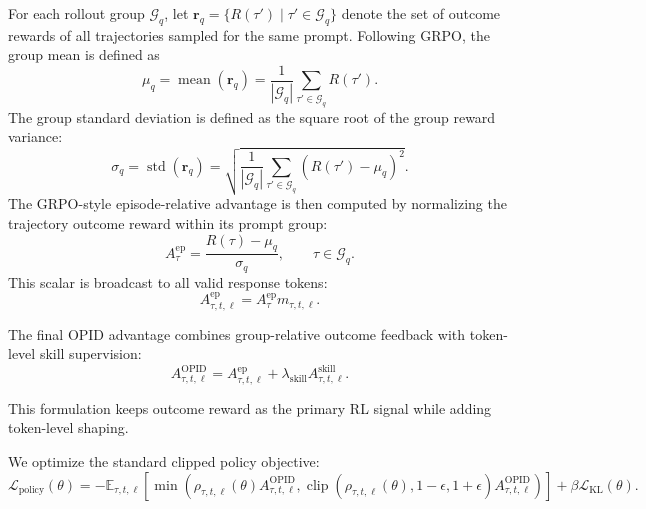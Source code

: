 For each rollout group $\mathcal{G}_q$, let
$\mathbf{r}_q=\{R(\tau')\mid \tau'\in\mathcal{G}_q\}$ denote the set of outcome rewards of all trajectories sampled for the same prompt. Following GRPO, the group mean is defined as
\begin{equation*}
    \mu_q
    =
    \operatorname{mean}(\mathbf{r}_q)
    =
    \frac{1}{|\mathcal{G}_q|}
    \sum_{\tau'\in\mathcal{G}_q} R(\tau').
\end{equation*}
The group standard deviation is defined as the square root of the group reward variance:
\begin{equation*}
    \sigma_q
    =
    \operatorname{std}(\mathbf{r}_q)
    =
    \sqrt{
    \frac{1}{|\mathcal{G}_q|}
    \sum_{\tau'\in\mathcal{G}_q}
    \left(R(\tau')-\mu_q\right)^2
    }.
\end{equation*}
The GRPO-style episode-relative advantage is then computed by normalizing the trajectory outcome reward within its prompt group:
\begin{equation*}
    A^{\mathrm{ep}}_{\tau}
    =
    \frac{R(\tau)-\mu_q}{\sigma_q},
    \qquad \tau\in\mathcal{G}_q.
\end{equation*}
This scalar is broadcast to all valid response tokens:
\begin{equation*}
    A^{\mathrm{ep}}_{\tau,t,\ell}
    =
    A^{\mathrm{ep}}_{\tau} m_{\tau,t,\ell}.
\end{equation*}

The final OPID advantage combines group-relative outcome feedback with token-level skill supervision:
\begin{equation*}
    A^{\text{OPID}}_{\tau,t,\ell}
    =
    A^{\mathrm{ep}}_{\tau,t,\ell}
    +
    \lambda_{\mathrm{skill}}
    A^{\mathrm{skill}}_{\tau,t,\ell}.
\end{equation*}

This formulation keeps outcome reward as the primary RL signal while adding token-level shaping.

We optimize the standard clipped policy objective:
\begin{equation*}
    \mathcal{L}_{\mathrm{policy}}(\theta)
    =
    -
    \mathbb{E}_{\tau,t,\ell}
    \left[
    \min
    \left(
        \rho_{\tau,t,\ell}(\theta) A^{\text{OPID}}_{\tau,t,\ell},
        \operatorname{clip}
        \left(
            \rho_{\tau,t,\ell}(\theta),
            1-\epsilon,
            1+\epsilon
        \right)
        A^{\text{OPID}}_{\tau,t,\ell}
    \right)
    \right] +\beta \mathcal L_{\mathrm{KL}}(\theta).
\end{equation*}

